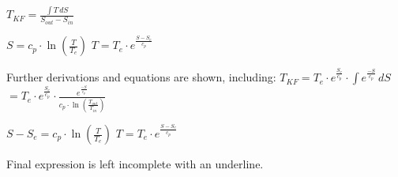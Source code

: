 \( T_{KF} = \frac{\int T \, dS}{S_{out} - S_{in}} \)  

\( S = c_p \cdot \ln \left( \frac{T}{T_e} \right) \)  
\( T = T_e \cdot e^{\frac{S - S_e}{c_p}} \)  

Further derivations and equations are shown, including:  
\( T_{KF} = T_e \cdot e^{\frac{S_e}{c_p}} \cdot \int e^{\frac{-S}{c_p}} \, dS \)  
\( = T_e \cdot e^{\frac{S_e}{c_p}} \cdot \frac{e^{\frac{-S}{c_p}}}{c_p \cdot \ln \left( \frac{T_{out}}{T_{in}} \right)} \)  

\( S - S_e = c_p \cdot \ln \left( \frac{T}{T_e} \right) \)  
\( T = T_e \cdot e^{\frac{S - S_e}{c_p}} \)  

Final expression is left incomplete with an underline.